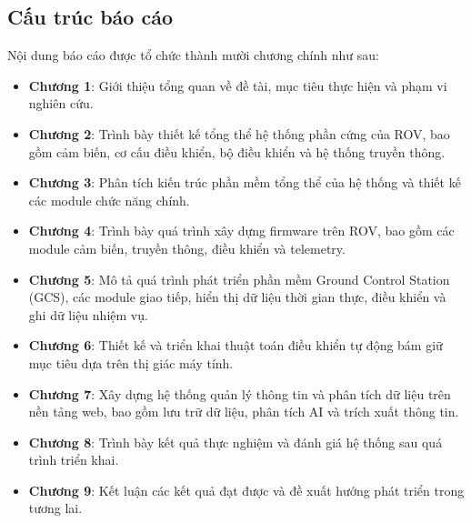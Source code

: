 \documentclass[../DoAn.tex]{subfiles}
\begin{document}
\subsection{Cấu trúc báo cáo}
\label{subsection:1.1.4}

Nội dung báo cáo được tổ chức thành mười chương chính như sau:

\begin{itemize}
    \item \textbf{Chương 1}: Giới thiệu tổng quan về đề tài, mục tiêu thực hiện và phạm vi nghiên cứu.
    
    \item \textbf{Chương 2}: Trình bày thiết kế tổng thể hệ thống phần cứng của ROV, bao gồm cảm biến, cơ cấu điều khiển, bộ điều khiển và hệ thống truyền thông.
    
    \item \textbf{Chương 3}: Phân tích kiến trúc phần mềm tổng thể của hệ thống và thiết kế các module chức năng chính.
    
    \item \textbf{Chương 4}: Trình bày quá trình xây dựng firmware trên ROV, bao gồm các module cảm biến, truyền thông, điều khiển và telemetry.
    
    \item \textbf{Chương 5}: Mô tả quá trình phát triển phần mềm Ground Control Station (GCS), các module giao tiếp, hiển thị dữ liệu thời gian thực, điều khiển và ghi dữ liệu nhiệm vụ.
    
    \item \textbf{Chương 6}: Thiết kế và triển khai thuật toán điều khiển tự động bám giữ mục tiêu dựa trên thị giác máy tính.
    
    \item \textbf{Chương 7}: Xây dựng hệ thống quản lý thông tin và phân tích dữ liệu trên nền tảng web, bao gồm lưu trữ dữ liệu, phân tích AI và trích xuất thông tin.
    
    \item \textbf{Chương 8}: Trình bày kết quả thực nghiệm và đánh giá hệ thống sau quá trình triển khai.
    
    \item \textbf{Chương 9}: Kết luận các kết quả đạt được và đề xuất hướng phát triển trong tương lai.
\end{itemize}
\end{document}
